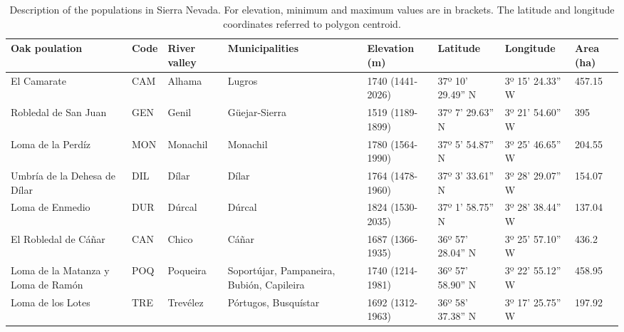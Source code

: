 \begin{table} 
\caption{Description of the \Qp populations in Sierra Nevada. For elevation, minimum and maximum values are in brackets. The latitude and longitude coordinates referred to polygon centroid.}\label{tab:multivar:tpop}
\begin{adjustbox}{width=\linewidth}
	\begin{threeparttable}
		\begin{tabular}{@{}llllllll@{}}
			\toprule
			Oak poulation & Code & River valley & Municipalities & Elevation (m) & Latitude & Longitude & Area (ha) \\ \midrule
			El Camarate & CAM & Alhama & Lugros & 1740  (1441-2026) & 37º 10' 29.49'' N & 3º 15' 24.33'' W & 457.15 \\
			Robledal de San Juan & GEN & Genil & Güejar-Sierra & 1519  (1189-1899) & 37º 7' 29.63'' N & 3º 21' 54.60'' W & 395 \\
			Loma de la Perdíz & MON & Monachil & Monachil & 1780  (1564-1990) & 37º 5' 54.87'' N & 3º 25' 46.65'' W & 204.55 \\
			Umbría de la Dehesa de Dílar & DIL & Dílar & Dílar & 1764  (1478-1960) & 37º 3' 33.61'' N & 3º 28' 29.07'' W & 154.07 \\
			Loma de Enmedio & DUR & Dúrcal & Dúrcal & 1824  (1530-2035) & 37º 1' 58.75'' N & 3º 28' 38.44'' W & 137.04 \\
			El Robledal de Cáñar & CAN & Chico & Cáñar & 1687  (1366-1935) & 36º 57' 28.04'' N & 3º 25' 57.10'' W & 436.2 \\
			Loma de la Matanza y Loma de Ramón & POQ & Poqueira & Soportújar, Pampaneira, Bubión, Capileira & 1740  (1214-1981) & 36º 57' 58.90'' N & 3º 22' 55.12'' W & 458.95 \\
			Loma de los Lotes & TRE & Trevélez & Pórtugos, Busquístar & 1692  (1312-1963) & 36º 58' 37.38'' N & 3º 17' 25.75'' W & 197.92 \\ \bottomrule
		\end{tabular}
	\end{threeparttable}
\end{adjustbox}
\end{table}

